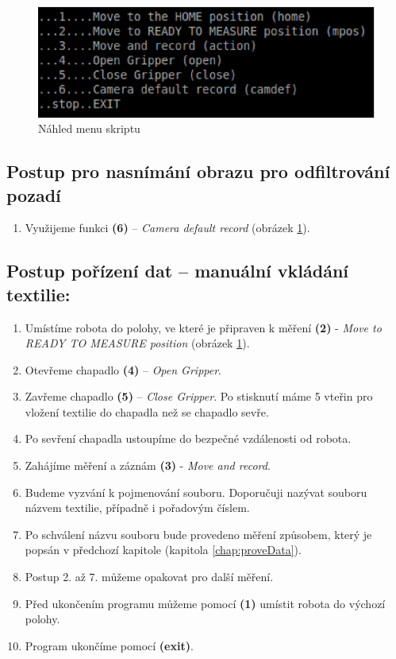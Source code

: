 \documentclass[10pt,a4paper,titlepage,oneside]{report}
\begin{document}
\begin{figure}[H]
	\centering  	
  	\includegraphics[scale=0.6]{pictures/obrazek3.eps}
  	\caption{Náhled menu skriptu}
  	\label{fig:menu}
\end{figure}

\subsection{Postup pro nasnímání obrazu pro odfiltrování pozadí}
\label{subsec:processFiltrSave}
\begin{enumerate}
  \item Využijeme funkci \textbf{(6)} – \textit{Camera default record} (obrázek \ref{fig:menu}).
\end{enumerate}

\subsection{Postup pořízení dat – manuální vkládání textilie:}
\begin{enumerate}
  \item Umístíme robota do polohy, ve které je připraven k měření \textbf{(2)} - \textit{Move to READY TO MEASURE position} (obrázek \ref{fig:menu}).
  \item Otevřeme chapadlo \textbf{(4)} – \textit{Open Gripper}.
  \item Zavřeme chapadlo \textbf{(5)} – \textit{Close Gripper}. Po stisknutí máme 5 vteřin pro vložení textilie do chapadla než se chapadlo sevře.
  \item Po sevření chapadla ustoupíme do bezpečné vzdálenosti od robota.
  \item Zahájíme měření a záznám \textbf{(3)} - \textit{Move and record}.
  \item Budeme vyzvání k pojmenování souboru. Doporučuji nazývat souboru názvem textilie, případně i pořadovým číslem.
  \item Po schválení názvu souboru bude provedeno měření způsobem, který je popsán v předchozí kapitole  (kapitola \ref{chap:proveData}).
  \item Postup 2. až 7. můžeme opakovat pro další měření.
  \item Před ukončením programu můžeme pomocí \textbf{(1)} umístit robota do výchozí polohy.
  \item Program ukončíme pomocí \textbf{(exit)}.
\end{enumerate}
\end{document}
